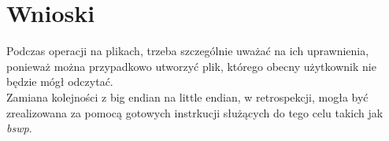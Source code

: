 \documentclass[11pt]{report}
\begin{document}
\section{Wnioski}
Podczas operacji na plikach, trzeba szczególnie uważać na ich uprawnienia, ponieważ można przypadkowo utworzyć plik, którego obecny użytkownik nie będzie mógł odczytać.\\
Zamiana kolejności z big endian na little endian, w retrospekcji, mogła być zrealizowana za pomocą gotowych instrkucji służących do tego celu takich jak \textit{bswp}.
\label{sec:wnioski}
\end{document}
